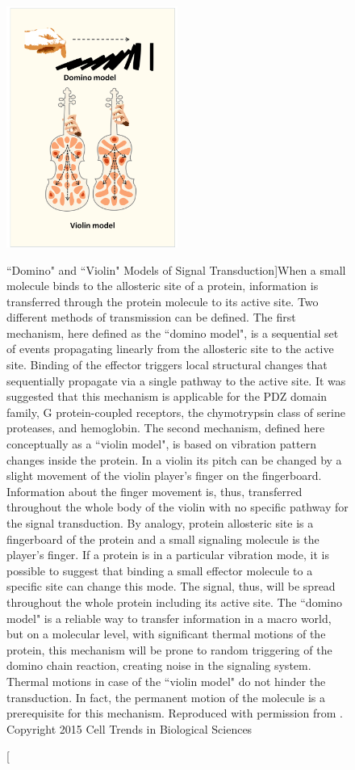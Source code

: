 \begin{figure}[htbp]
\centering
\includegraphics[width=0.5\textwidth]{./Figures/violin_metaphor.png}
\caption[``Domino" and ``Violin" Models of Signal Transduction]{When a small molecule binds to the allosteric site of a protein, information is transferred through the protein molecule to its active site. Two different methods of transmission can be defined. The first mechanism, here defined as the ``domino model", is a sequential set of events propagating linearly from the allosteric site to the active site. Binding of the effector triggers local structural changes that sequentially propagate via a single pathway to the active site. It was suggested that this mechanism is applicable for the PDZ domain family\cite{Lockless1999}, G protein-coupled receptors, the chymotrypsin class of serine proteases, and hemoglobin\cite{Suel2003a}. The second mechanism, defined here conceptually as a ``violin model", is based on vibration pattern changes inside the protein. In a violin its pitch can be changed by a slight movement of the violin player's finger on the fingerboard. Information about the finger movement is, thus, transferred throughout the whole body of the violin with no specific pathway for the signal transduction. By analogy, protein allosteric site is a fingerboard of the protein and a small signaling molecule is the player's finger. If a protein is in a particular vibration mode, it is possible to suggest that binding a small effector molecule to a specific site can change this mode. The signal, thus, will be spread throughout the whole protein including its active site. The ``domino model" is a reliable way to transfer information in a macro world, but on a molecular level, with significant thermal motions of the protein, this mechanism will be prone to random triggering of the domino chain reaction, creating noise in the signaling system. Thermal motions in case of the ``violin model" do not hinder the transduction. In fact, the permanent motion of the molecule is a prerequisite for this mechanism. Reproduced with permission from . Copyright 2015 Cell Trends in Biological Sciences}
\end{figure}

